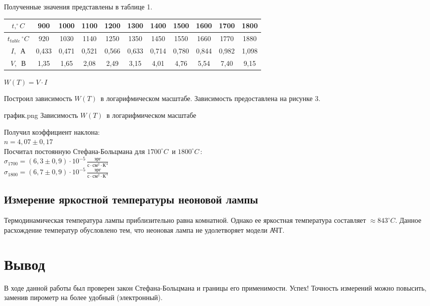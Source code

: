 Полученные значения представлены в таблице 1.

\begin{table}[h!]
\begin{center}

    \begin{tabular}{|c|c|c|c|c|c|c|c|c|c|c|}
    \hline
    $ t, ^\circ C $          & 900   & 1000  & 1100  & 1200  & 1300  & 1400  & 1500  & 1600  & 1700  & 1800  \\ \hline
    $ t_{table} \, ^\circ C $& 920   & 1030  & 1140  & 1250  & 1350  & 1450  & 1550  & 1660  & 1770  & 1880  \\ \hline
    $ I, \, $ А              & 0,433& 0,471& 0,521& 0,566& 0,633& 0,714& 0,780& 0,844& 0,982& 1,098\\ \hline
    $ V, \, $ В              & 1,35& 1,65& 2,08& 2,49& 3,15& 4,01& 4,76& 5,54& 7,40& 9,15\\\hline
    \end{tabular}

\end{center}
\end{table}

$W(T) = V \cdot I$

Построил зависимость $ W \left( T \right) \, $ в логарифмическом масштабе. Зависимость
предоставлена на рисунке 3.

{график.png}
{Зависимость $ W \left( T \right) \, $ в логарифмическом масштабе}

Получил коэффициент наклона: \\

$ n = 4,07 \pm 0,17 $ \\

Посчитал постоянную Стефана-Больцмана для $ 1700 ^\circ C \, $ и $ 1800 ^\circ C \, $: \\

$ \sigma_{1700} = \left( 6,3 \pm 0,9 \right) \cdot 10^{-5} \,
\frac{\text{эрг}} {\text{с} \cdot \text{см}^2 \cdot \text{К}^4} $ \\

$ \sigma_{1800} = \left( 6,7 \pm 0,9 \right) \cdot 10^{-5} \,
\frac{\text{эрг}} {\text{с} \cdot \text{см}^2 \cdot \text{К}^4} $ \\

\subsection{Измерение яркостной температуры неоновой лампы}

Термодинамическая температура лампы приблизительно равна комнатной. Однако ее яркостная
температура составляет $ \approx 843^\circ C $. Данное расхождение температур обусловлено
тем, что неоновая лампа не удолетворяет модели АЧТ.

\section{Вывод}

В ходе данной работы был проверен закон Стефана-Больцмана и границы его применимости. Успех!
Точность измерений можно повысить, заменив пирометр на более удобный (электронный).
